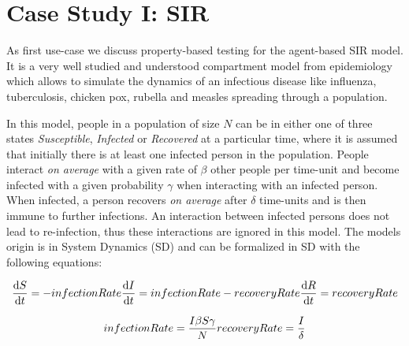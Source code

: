 \section{Case Study I: SIR}
\label{sec:case_SIR}

As first use-case we discuss property-based testing for the agent-based SIR model. It is a very well studied and understood compartment model from epidemiology \cite{kermack_contribution_1927} which allows to simulate the dynamics of an infectious disease like influenza, tuberculosis, chicken pox, rubella and measles spreading through a population.

In this model, people in a population of size $N$ can be in either one of three states \textit{Susceptible}, \textit{Infected} or \textit{Recovered} at a particular time, where it is assumed that initially there is at least one infected person in the population. People interact \textit{on average} with a given rate of $\beta$ other people per time-unit and become infected with a given probability $\gamma$ when interacting with an infected person. When infected, a person recovers \textit{on average} after $\delta$ time-units and is then immune to further infections. An interaction between infected persons does not lead to re-infection, thus these interactions are ignored in this model. The models origin is in System Dynamics (SD) \cite{porter_industrial_1962} and can be formalized in SD with the following equations:

\begin{equation}
\frac{\mathrm d S}{\mathrm d t} = -infectionRate \\ 
\frac{\mathrm d I}{\mathrm d t} = infectionRate - recoveryRate \\ 
\frac{\mathrm d R}{\mathrm d t} = recoveryRate 
\end{equation}

\begin{equation}
infectionRate = \frac{I \beta S \gamma}{N} \\
recoveryRate = \frac{I}{\delta} 
\end{equation}

%


